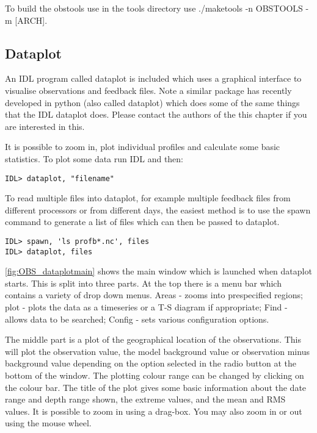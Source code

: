 \documentclass[../main/NEMO_manual]{subfiles}
\begin{document}
To build the obstools use in the tools directory use ./maketools -n OBSTOOLS -m [ARCH].

\subsection{Dataplot}

An IDL program called dataplot is included which uses a graphical interface to
visualise observations and feedback files. Note a similar package has recently developed in python (also called dataplot) which does some of the same things that the IDL dataplot does. Please contact the authors of the this chapter if you are interested in this.

It is possible to zoom in, plot individual profiles and calculate some basic statistics.
To plot some data run IDL and then:

\begin{verbatim}
IDL> dataplot, "filename"
\end{verbatim}

To read multiple files into dataplot,
for example multiple feedback files from different processors or from different days,
the easiest method is to use the spawn command to generate a list of files which can then be passed to dataplot.

\begin{verbatim}
IDL> spawn, 'ls profb*.nc', files
IDL> dataplot, files
\end{verbatim}

\autoref{fig:OBS_dataplotmain} shows the main window which is launched when dataplot starts.
This is split into three parts.
At the top there is a menu bar which contains a variety of drop down menus.
Areas - zooms into prespecified regions;
plot - plots the data as a timeseries or a T-S diagram if appropriate;
Find - allows data to be searched;
Config - sets various configuration options.

The middle part is a plot of the geographical location of the observations.
This will plot the observation value, the model background value or observation minus background value depending on
the option selected in the radio button at the bottom of the window.
The plotting colour range can be changed by clicking on the colour bar.
The title of the plot gives some basic information about the date range and depth range shown,
the extreme values, and the mean and RMS values.
It is possible to zoom in using a drag-box.
You may also zoom in or out using the mouse wheel.
\end{document}
